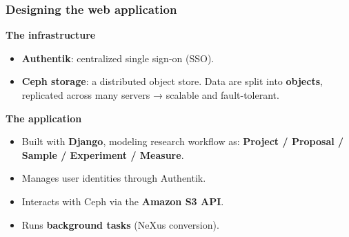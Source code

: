 \documentclass{beamer}
\begin{document}
\begin{frame}
	\end{frame}
	
	\begin{frame}
		\frametitle{Designing the web application}
		
		\textbf{The infrastructure}
		\begin{itemize}
			\item \textbf{Authentik}: centralized single sign-on (SSO).
			\item \textbf{Ceph storage}: a distributed object store.  
			Data are split into \textbf{objects}, replicated across many servers → scalable and fault-tolerant.
		\end{itemize}
		
		\vspace{0.8em}
		
		\textbf{The application}
		\begin{itemize}
			\item Built with \textbf{Django}, modeling research workflow as:
			\textbf{Project / Proposal / Sample / Experiment / Measure}.
			\item Manages user identities through Authentik.
			\item Interacts with Ceph via the \textbf{Amazon S3 API}.
			\item Runs \textbf{background tasks} (NeXus conversion).
		\end{itemize}
	\end{frame}
	
\end{document}
